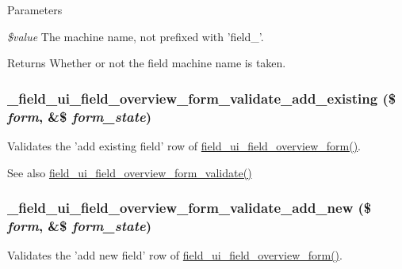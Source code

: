 \begin{DoxyParams}{Parameters}
\item[{\em \$value}]The machine name, not prefixed with 'field\_\-'.\end{DoxyParams}
\begin{DoxyReturn}{Returns}
Whether or not the field machine name is taken. 
\end{DoxyReturn}
\hypertarget{field__ui_8admin_8inc_af37b017d0f737108fe36a3a7510d7c41}{
\subsubsection[{\_\-field\_\-ui\_\-field\_\-overview\_\-form\_\-validate\_\-add\_\-existing}]{\setlength{\rightskip}{0pt plus 5cm}\_\-field\_\-ui\_\-field\_\-overview\_\-form\_\-validate\_\-add\_\-existing (\$ {\em form}, \/  \&\$ {\em form\_\-state})}}
\label{field__ui_8admin_8inc_af37b017d0f737108fe36a3a7510d7c41}
Validates the 'add existing field' row of \hyperlink{group__forms_gad62638f853fe251696eb3b57e8111845}{field\_\-ui\_\-field\_\-overview\_\-form()}.

\begin{DoxySeeAlso}{See also}
\hyperlink{field__ui_8admin_8inc_a1e5fb5a6f69ee3f155c3b433ad78ba1e}{field\_\-ui\_\-field\_\-overview\_\-form\_\-validate()} 
\end{DoxySeeAlso}
\hypertarget{field__ui_8admin_8inc_a2b8d7fe2bc8042c2548d0da84a11e068}{
\subsubsection[{\_\-field\_\-ui\_\-field\_\-overview\_\-form\_\-validate\_\-add\_\-new}]{\setlength{\rightskip}{0pt plus 5cm}\_\-field\_\-ui\_\-field\_\-overview\_\-form\_\-validate\_\-add\_\-new (\$ {\em form}, \/  \&\$ {\em form\_\-state})}}
\label{field__ui_8admin_8inc_a2b8d7fe2bc8042c2548d0da84a11e068}
Validates the 'add new field' row of \hyperlink{group__forms_gad62638f853fe251696eb3b57e8111845}{field\_\-ui\_\-field\_\-overview\_\-form()}.

